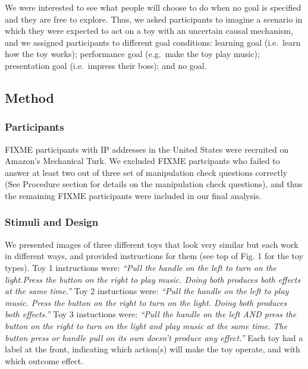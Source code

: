 \documentclass[10pt, letterpaper]{article}
\begin{document}
We were interested to see what people will choose to do when no goal is
specified and they are free to explore. Thus, we asked participants to
imagine a scenario in which they were expected to act on a toy with an
uncertain causal mechanism, and we assigned participants to different
goal conditions: learning goal (i.e.~learn how the toy works);
performance goal (e.g.~make the toy play music); presentation goal
(i.e.~impress their boss); and no goal.

\subsection{Method}\label{method}

\subsubsection{Participants}\label{participants}

FIXME participants with IP addresses in the United States were recruited
on Amazon's Mechanical Turk. We excluded FIXME partcipants who failed to
answer at least two out of three set of manipulation check questions
correctly (See Procedure section for details on the manipulation check
questions), and thus the remaining FIXME participants were included in
our final analysis.

\subsubsection{Stimuli and Design}\label{stimuli-and-design}

We presented images of three different toys that look very similar but
each work in different ways, and provided instructions for them (see top
of Fig. 1 for the toy types). Toy 1 instructions were: \emph{``Pull the
handle on the left to turn on the light.Press the button on the right to
play music. Doing both produces both effects at the same time.''} Toy 2
instuctions were: \emph{``Pull the handle on the left to play music.
Press the button on the right to turn on the light. Doing both produces
both effects.''} Toy 3 instuctions were: \emph{``Pull the handle on the
left AND press the button on the right to turn on the light and play
music at the same time. The button press or handle pull on its own
doesn't produce any effect.''} Each toy had a label at the front,
indicating which action(s) will make the toy operate, and with which
outcome effect.
\end{document}
